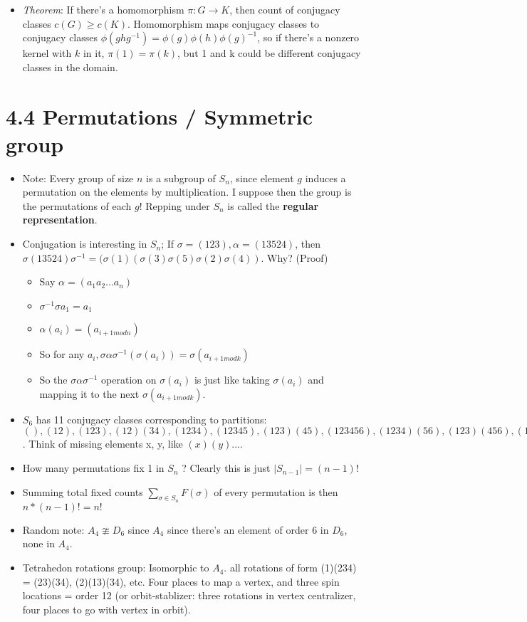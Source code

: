 \documentclass[11pt, oneside]{article}   	%
\begin{document}
\begin{itemize}
\item \emph{Theorem}: If there's a homomorphism $\pi: G \rightarrow K$, then count of  conjugacy classes $c(G) \geq c(K)$.  Homomorphism maps conjugacy classes to conjugacy classes $\phi(ghg^{-1}) = \phi(g)\phi(h)\phi(g)^{-1}$, so if there's a nonzero kernel with $k$ in it, $\pi(1) = \pi(k)$, but 1 and k could be different conjugacy classes in the domain.

\end{itemize}

\section{4.4 Permutations / Symmetric group}
\begin{itemize}
\item Note: Every group of size $n$ is a subgroup of $S_n$, since element $g$ induces a permutation on the elements by multiplication.  I suppose then the group is the permutations of each $g$!  Repping under $S_n$ is called the \textbf{regular representation}.
\item Conjugation is interesting in $S_n$; If $\sigma = (123), \alpha = (13524)$, then $\sigma(13524)\sigma^{-1} = (\sigma(1)(\sigma(3)\sigma(5)\sigma(2)\sigma(4))$.  Why?    (Proof)
\begin {itemize}
\item Say $\alpha = (a_1 a_2 ... a_n)$
\item $\sigma^{-1}\sigma a_1 = a_1$
\item $\alpha(a_i) = (a_{i+1 mod n})$ 
\item So for any $a_i, \sigma \alpha \sigma^{-1}(\sigma (a_i)) = \sigma (a_{i+1 mod k})$
\item So the $\sigma \alpha \sigma^{-1}$ operation on $\sigma(a_i)$ is just like taking $\sigma(a_i)$ and mapping it to the next $\sigma(a_{i+1 mod k})$.
\end {itemize}
\item $S_6$ has 11 conjugacy classes corresponding to partitions: $(), (1 2), (1 2 3), (1 2)(3 4), (1 2 3 4), (1 2 3 4 5), (1 2 3)(4 5), (1 2 3 4 5 6), (1 2 3 4)(5 6), (1 2 3)(4 5 6), (1 2)(3 4)(5 6)$.  Think of missing elements x, y, like $(x)(y)...$.
\item How many permutations fix 1 in $S_n$ ? Clearly this is just $|S_{n-1}| = (n-1)!$
\item Summing total fixed counts $\sum_{\sigma \in S_n} F(\sigma)$ of every permutation is then $n*(n-1)! = n!$
\item Random note: $A_4 \ncong D_6$ since $A_4$ since there's an element of order 6 in $D_6$, none in $A_4$.
\item Tetrahedon rotations group: Isomorphic to $A_4$.  all rotations of form (1)(234) = (23)(34), (2)(13)(34), etc.  Four places to map a vertex, and three spin locations = order 12 (or orbit-stablizer: three rotations in vertex centralizer, four places to go with vertex in orbit).
\end{itemize}
\end{document}

